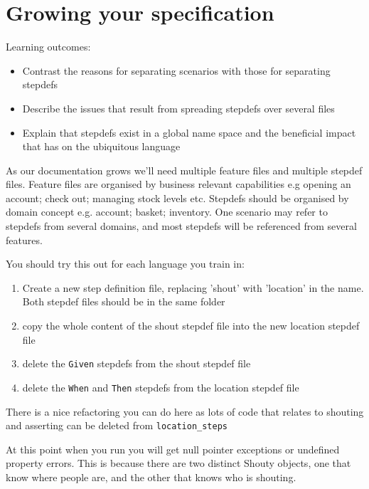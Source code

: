 \chapter*{Growing your specification}

\ifnotes

    Learning outcomes:
    
    \begin{itemize}
        \item Contrast the reasons for separating scenarios with those for separating stepdefs
        \item Describe the issues that result from spreading stepdefs over several files
        \item Explain that stepdefs exist in a global name space and the beneficial impact that has on the ubiquitous language
    \end{itemize}
    
    As our documentation grows we'll need multiple feature files and multiple stepdef files. Feature files are organised by business relevant capabilities e.g opening an account; check out; managing stock levels etc. Stepdefs should be organised by domain concept e.g. account; basket; inventory. One scenario may refer to stepdefs from several domains, and most stepdefs will be referenced from several features.
    
    You should try this out for each language you train in:
    \begin{enumerate}
        \item Create a new step definition file, replacing 'shout' with 'location' in the name. Both stepdef files should be in the same folder
        \item copy the whole content of the shout stepdef file into the new location stepdef file
        \item delete the \texttt{Given} stepdefs from the shout stepdef file
        \item delete the \texttt{When} and \texttt{Then} stepdefs from the location stepdef file
    \end{enumerate}
    
    There is a nice refactoring you can do here as lots of code that relates to shouting and asserting can be deleted from \texttt{location\_steps}
    
    At this point when you run \CUKE{} you will get null pointer exceptions or undefined property errors. This is because there are two distinct Shouty objects, one that know where people are, and the other that knows who is shouting.

